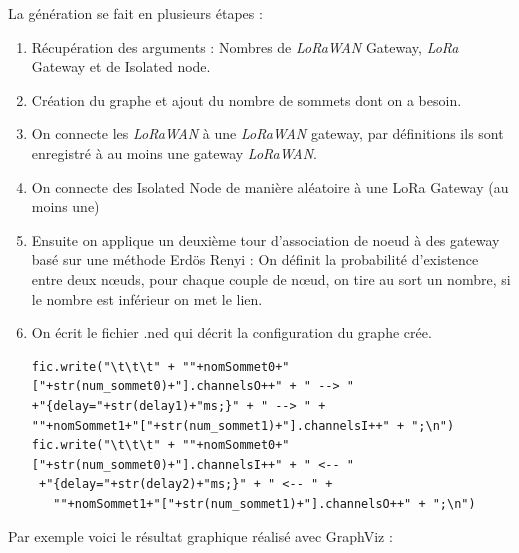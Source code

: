La génération se fait en plusieurs étapes : 
\begin{enumerate}
\item Récupération des arguments : Nombres de  \textit{LoRaWAN} Gateway, \textit{LoRa} Gateway et de Isolated node.	
\item Création du graphe et ajout du nombre de sommets dont on a besoin.
\item On connecte les  \textit{LoRaWAN} à une  \textit{LoRaWAN} gateway, par définitions ils sont enregistré à au moins une gateway  \textit{LoRaWAN}.
\item On connecte des Isolated Node de manière aléatoire à une LoRa Gateway (au moins une)
\item Ensuite on applique un deuxième tour d'association de noeud à des gateway 	basé sur une méthode  Erdös Renyi : On définit la probabilité d'existence entre deux nœuds, pour chaque couple de nœud, on tire au sort un nombre, si le nombre est inférieur on met le lien.
\item On écrit le fichier .ned qui décrit la configuration du graphe crée. 

\begin{verbatim}
fic.write("\t\t\t" + ""+nomSommet0+"["+str(num_sommet0)+"].channelsO++" + " --> "
+"{delay="+str(delay1)+"ms;}" + " --> " +
""+nomSommet1+"["+str(num_sommet1)+"].channelsI++" + ";\n")
fic.write("\t\t\t" + ""+nomSommet0+"["+str(num_sommet0)+"].channelsI++" + " <-- "
 +"{delay="+str(delay2)+"ms;}" + " <-- " +
   ""+nomSommet1+"["+str(num_sommet1)+"].channelsO++" + ";\n")
\end{verbatim}

\end{enumerate}
Par exemple voici le résultat graphique réalisé avec GraphViz :

